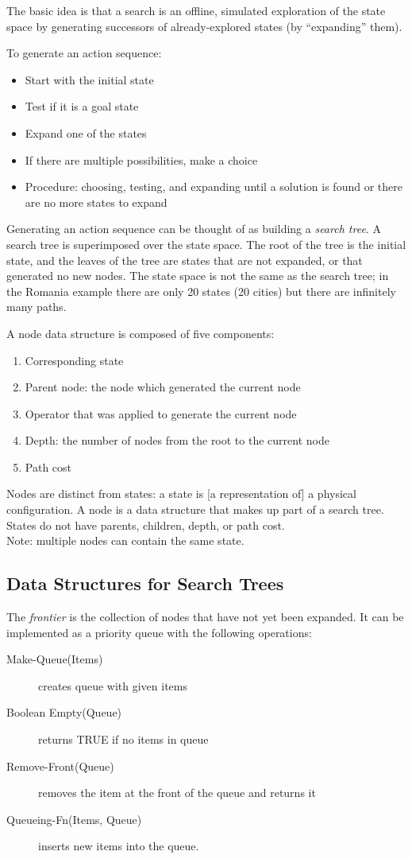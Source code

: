 The basic idea is that a search is an offline, simulated exploration of the
state space by generating successors of already-explored states (by ``expanding''
them).

To generate an action sequence:
\begin{itemize}
    \item Start with the initial state
    \item Test if it is a goal state
    \item Expand one of the states
    \item If there are multiple possibilities, make a choice
    \item Procedure: choosing, testing, and expanding until a solution is found
    or there are no more states to expand
\end{itemize}

Generating an action sequence can be thought of as building a \textit{search
tree}. A search tree is superimposed over the state space. The root of the tree
is the initial state, and the leaves of the tree are states that are not
expanded, or that generated no new nodes. The state space is not the same as
the search tree; in the Romania example there are only 20 states (20 cities)
but there are infinitely many paths.

A node data structure is composed of five components:
\begin{enumerate}
    \item Corresponding state
    \item Parent node: the node which generated the current node
    \item Operator that was applied to generate the current node
    \item Depth: the number of nodes from the root to the current node
    \item Path cost
\end{enumerate}

Nodes are distinct from states: a state is [a representation of] a physical
configuration. A node is a data structure that makes up part of a search tree.
States do not have parents, children, depth, or path cost.\\
Note: multiple nodes can contain the same state.

\subsection{Data Structures for Search Trees}
The \textit{frontier} is the collection of nodes that have not yet been
expanded. It can be implemented as a priority queue with the following
operations:
\begin{description}
    \item[Make-Queue(Items)] creates queue with given items
    \item[Boolean Empty(Queue)] returns TRUE if no items in queue
    \item[Remove-Front(Queue)] removes the item at the front of the queue and
    returns it
    \item[Queueing-Fn(Items, Queue)] inserts new items into the queue.
\end{description}

